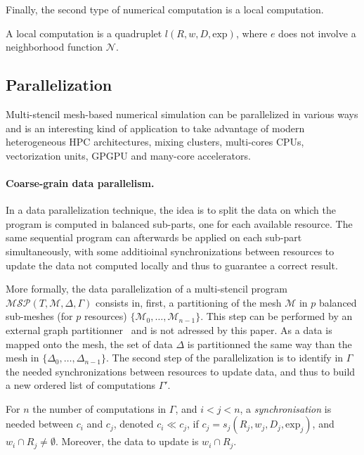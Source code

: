 Finally, the second type of numerical computation is a local computation.
\begin{mydef}
A local computation is a quadruplet $l(R,w,D,\text{exp})$, where $e$ does not involve a neighborhood function $\mathcal{N}$.
\end{mydef}

\subsection{Parallelization}
\label{sect:parall}
Multi-stencil mesh-based numerical simulation can be parallelized in various ways and is an interesting kind of application to take advantage of modern heterogeneous HPC architectures, mixing clusters, multi-cores CPUs, vectorization units, GPGPU and many-core accelerators.

\paragraph{Coarse-grain data parallelism.} In a data parallelization technique, the idea is to split the data on which the program is computed in balanced sub-parts, one for each available resource. The same sequential program can afterwards be applied on each sub-part simultaneously, with some additioinal synchronizations between resources to update the data not computed locally and thus to guarantee a correct result.

More formally, the data parallelization of a multi-stencil program $\mathcal{MSP}(T,\mathcal{M},\Delta,\Gamma)$ consists in, first, a partitioning of the mesh $\mathcal{M}$ in $p$ balanced sub-meshes (for $p$ resources) $\{\mathcal{M}_0,\dots,\mathcal{M}_{n-1}\}$. This step can be performed by an external graph partitionner~\cite{} and is not adressed by this paper. As a data is mapped onto the mesh, the set of data $\Delta$ is partitionned the same way than the mesh in $\{\Delta_0,\dots,\Delta_{n-1}\}$. The second step of the parallelization is to identify in $\Gamma$ the needed synchronizations between resources to update data, and thus to build a new ordered list of computations $\Gamma'$.

\begin{mydef}
For $n$ the number of computations in $\Gamma$, and $i<j<n$, a \textit{synchronisation} is needed between $c_i$ and $c_j$, denoted $c_i \ll c_j$, if $c_j=s_j(R_j,w_j,D_j,\text{exp}_j)$, and $w_i \cap R_j \neq \emptyset$. Moreover, the data to update is $w_i \cap R_j$.
\end{mydef}

